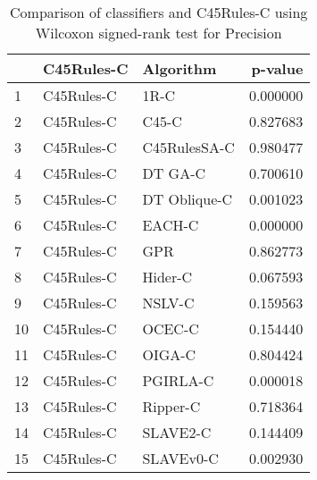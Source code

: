 \begin{table}
\footnotesize
\caption{Comparison of classifiers and C45Rules-C using Wilcoxon signed-rank test for Precision}
\label{tab:C45Rules-C wilcoxon Precision comparison}
\begin{tabular}{lllr}
\hline
 & C45Rules-C & Algorithm & p-value \\
\hline
1 & C45Rules-C & 1R-C & 0.000000 \\
2 & C45Rules-C & C45-C & 0.827683 \\
3 & C45Rules-C & C45RulesSA-C & 0.980477 \\
4 & C45Rules-C & DT GA-C & 0.700610 \\
5 & C45Rules-C & DT Oblique-C & 0.001023 \\
6 & C45Rules-C & EACH-C & 0.000000 \\
7 & C45Rules-C & GPR & 0.862773 \\
8 & C45Rules-C & Hider-C & 0.067593 \\
9 & C45Rules-C & NSLV-C & 0.159563 \\
10 & C45Rules-C & OCEC-C & 0.154440 \\
11 & C45Rules-C & OIGA-C & 0.804424 \\
12 & C45Rules-C & PGIRLA-C & 0.000018 \\
13 & C45Rules-C & Ripper-C & 0.718364 \\
14 & C45Rules-C & SLAVE2-C & 0.144409 \\
15 & C45Rules-C & SLAVEv0-C & 0.002930 \\
\hline
\end{tabular}
\end{table}
